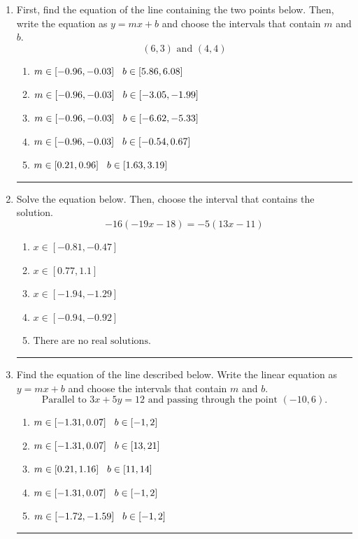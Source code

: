 \documentclass[14pt]{extbook}
\newcommand{\litem}[1]{\item#1\hspace*{-1cm}\rule{\textwidth}{0.4pt}}
\begin{document}
\begin{enumerate}
{\begin{enumerate}[label=\Alph*.]
\end{enumerate} }
\litem{
First, find the equation of the line containing the two points below. Then, write the equation as $ y=mx+b $ and choose the intervals that contain $m$ and $b$.\[ (6, 3) \text{ and } (4, 4) \]\begin{enumerate}[label=\Alph*.]
\item \( m \in [-0.96, -0.03] \hspace*{3mm} b \in [5.86, 6.08] \)
\item \( m \in [-0.96, -0.03] \hspace*{3mm} b \in [-3.05, -1.99] \)
\item \( m \in [-0.96, -0.03] \hspace*{3mm} b \in [-6.62, -5.33] \)
\item \( m \in [-0.96, -0.03] \hspace*{3mm} b \in [-0.54, 0.67] \)
\item \( m \in [0.21, 0.96] \hspace*{3mm} b \in [1.63, 3.19] \)

\end{enumerate} }
\litem{
Solve the equation below. Then, choose the interval that contains the solution.\[ -16(-19x -18) = -5(13x -11) \]\begin{enumerate}[label=\Alph*.]
\item \( x \in [-0.81, -0.47] \)
\item \( x \in [0.77, 1.1] \)
\item \( x \in [-1.94, -1.29] \)
\item \( x \in [-0.94, -0.92] \)
\item \( \text{There are no real solutions.} \)

\end{enumerate} }
\litem{
Find the equation of the line described below. Write the linear equation as $ y=mx+b $ and choose the intervals that contain $m$ and $b$.\[ \text{Parallel to } 3 x + 5 y = 12 \text{ and passing through the point } (-10, 6). \]\begin{enumerate}[label=\Alph*.]
\item \( m \in [-1.31, 0.07] \hspace*{3mm} b \in [-1, 2] \)
\item \( m \in [-1.31, 0.07] \hspace*{3mm} b \in [13, 21] \)
\item \( m \in [0.21, 1.16] \hspace*{3mm} b \in [11, 14] \)
\item \( m \in [-1.31, 0.07] \hspace*{3mm} b \in [-1, 2] \)
\item \( m \in [-1.72, -1.59] \hspace*{3mm} b \in [-1, 2] \)

\end{enumerate} }
\end{enumerate}
\end{document}
